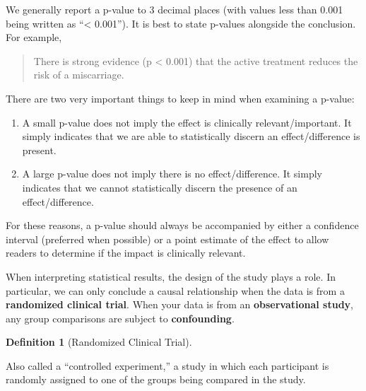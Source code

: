 \documentclass[
  letterpaper,
  DIV=11,
  numbers=noendperiod]{scrreprt}
\providecommand{\tightlist}{%
  \setlength{\itemsep}{0pt}\setlength{\parskip}{0pt}}\usepackage{longtable,booktabs,array}
\theoremstyle{definition}
\theoremstyle{definition}
\newtheorem{definition}{Definition}[chapter]
\theoremstyle{remark}
\begin{document}
We generally report a p-value to 3 decimal places (with values less than
0.001 being written as ``\textless{} 0.001''). It is best to state
p-values alongside the conclusion. For example,

\begin{quote}
There is strong evidence (p \textless{} 0.001) that the active treatment
reduces the risk of a miscarriage.
\end{quote}

\begin{tcolorbox}[enhanced jigsaw, bottomrule=.15mm, titlerule=0mm, bottomtitle=1mm, colback=white, coltitle=black, rightrule=.15mm, leftrule=.75mm, toprule=.15mm, toptitle=1mm, left=2mm, opacityback=0, colframe=quarto-callout-caution-color-frame, breakable, title=\textcolor{quarto-callout-caution-color}{\faFire}\hspace{0.5em}{Caution}, arc=.35mm, colbacktitle=quarto-callout-caution-color!10!white, opacitybacktitle=0.6]

There are two very important things to keep in mind when examining a
p-value:

\begin{enumerate}
\def\labelenumi{\arabic{enumi}.}
\tightlist
\item
  A small p-value does not imply the effect is clinically
  relevant/important. It simply indicates that we are able to
  statistically discern an effect/difference is present.
\item
  A large p-value does not imply there is no effect/difference. It
  simply indicates that we cannot statistically discern the presence of
  an effect/difference.
\end{enumerate}

\end{tcolorbox}

For these reasons, a p-value should always be accompanied by either a
confidence interval (preferred when possible) or a point estimate of the
effect to allow readers to determine if the impact is clinically
relevant.

When interpreting statistical results, the design of the study plays a
role. In particular, we can only conclude a causal relationship when the
data is from a \textbf{randomized clinical trial}. When your data is
from an \textbf{observational study}, any group comparisons are subject
to \textbf{confounding}.

\begin{definition}[Randomized Clinical
Trial]\protect\hypertarget{def-randomized-clinical-trial}{}\label{def-randomized-clinical-trial}

Also called a ``controlled experiment,'' a study in which each
participant is randomly assigned to one of the groups being compared in
the study.

\end{definition}
\end{document}
